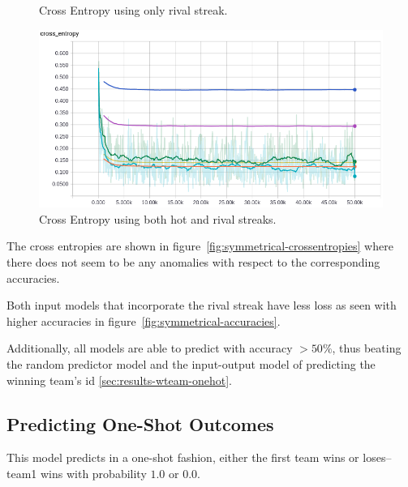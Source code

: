 \documentclass{article} %
\begin{document}
\begin{figure}[!htb]
  \caption{Cross Entropy using only rival streak.}\label{fig:symmetrical-r-crossentropy}
\endminipage
{}%
  \includegraphics[width=\linewidth]{plots/model1/symmetrical/streak-hr/crossentropy.png}
  \caption{Cross Entropy using both hot and rival streaks.}\label{fig:symmetrical-hr-crossentropy}
\endminipage
\end{figure}
\label{fig:symmetrical-crossentropies}

The cross entropies are shown in figure~\ref{fig:symmetrical-crossentropies} where there does not seem to be any anomalies with respect to the corresponding accuracies.

Both input models that incorporate the rival streak have less loss as seen with higher accuracies in figure~\ref{fig:symmetrical-accuracies}.

Additionally, all models are able to predict with accuracy $> 50\%$, thus beating the random predictor model and the input-output model of predicting the winning team's id \ref{sec:results-wteam-onehot}.

\subsection{Predicting One-Shot Outcomes}
\label{sec:results-oneshot}

This model predicts in a one-shot fashion, either the first team wins or loses--team1 wins with probability $1.0$ or $0.0$.
\end{document}
